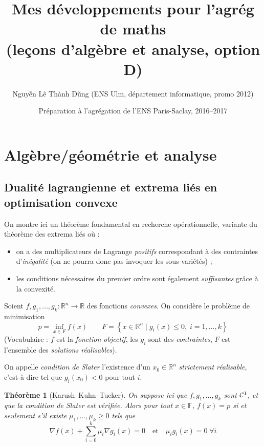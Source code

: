 \documentclass[a4paper, 11pt]{article}
\def\F{\mathbb{F}}
\def\R{\mathbb{R}}
\def\Cf{{\cal{C}}}
\newtheorem*{theorem}{Théorème}
\begin{document}
\title{Mes développements pour l'agrég de maths\\
  (leçons d'algèbre et analyse, option D)}
\author{Nguyễn Lê Thành Dũng (ENS Ulm, département informatique, promo 2012)}
\date{Préparation à l'agrégation de l'ENS Paris-Saclay, 2016--2017}
\maketitle

\tableofcontents

\newpage

\section{Algèbre/géométrie et analyse}

\subsection{Dualité lagrangienne et extrema liés en optimisation convexe}

On montre ici un théorème fondamental en recherche opérationnelle, variante du
théorème des extrema liés où :
\begin{itemize}
\item on a des multiplicateurs de Lagrange \emph{positifs} correspondant à des
  contraintes d'\emph{inégalité} (on ne pourra donc pas invoquer les
  sous-variétés) ;
\item les conditions nécessaires du premier ordre sont également
  \emph{suffisantes} grâce à la convexité.
\end{itemize}
Soient $f,g_1,\ldots,g_k : \R^n \to \R$ des fonctions \emph{convexes}.
On considère le problème de minimisation
\[ p = \inf_{x \in F} f(x) \qquad F = \left\{ x \in \R^n \mid
  g_i(x) \leq 0,\; i = 1,\ldots,k \right\} \]
(Vocabulaire : $f$ est la \emph{fonction objectif}, les $g_i$ sont des
\emph{contraintes}, $F$ est l'ensemble des \emph{solutions réalisables}).

On appelle \emph{condition de Slater} l'existence d'un $x_0 \in \R^n$
\emph{strictement réalisable}, c'est-à-dire tel que $g_i(x_0) < 0$ pour tout
$i$.

\begin{theorem}[Karush--Kuhn--Tucker]
  On suppose ici que $f, g_1, \ldots, g_k$ sont $\Cf^1$, et que la condition de
  Slater est vérifiée. Alors pour tout $x \in \F$, $f(x) = p$ si et seulement
  s'il existe $\mu_1, \ldots, \mu_k \geq 0$ tels que
  \[ \nabla f(x) + \sum_{i=0}^k \mu_i \nabla g_i(x) = 0 \quad \text{et} \quad
    \mu_i g_i(x) = 0\; \forall i
  \]
\end{theorem}
\end{document}
